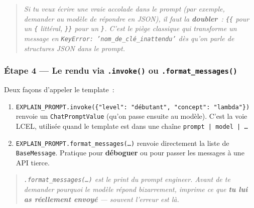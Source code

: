 \documentclass[11pt,a4paper]{article}
\begin{document}
\begin{quote}\itshape
Si tu veux écrire une \emph{vraie} accolade dans le prompt (par exemple,
demander au modèle de répondre en JSON), il faut la \textbf{doubler}~:
\texttt{\{\{} pour un \texttt{\{} littéral, \texttt{\}\}} pour un \texttt{\}}.
C'est le piège classique qui transforme un message en
\texttt{KeyError: 'nom\_de\_clé\_inattendu'} dès qu'on parle de structures
JSON dans le prompt.
\end{quote}

\subsubsection*{Étape 4 — Le rendu via \texttt{.invoke()} ou \texttt{.format\_messages()}}

\begin{center}
\end{center}

Deux façons d'appeler le template~:

\begin{enumerate}[leftmargin=*]
  \item \texttt{EXPLAIN\_PROMPT.invoke(\{"level": "débutant", "concept": "lambda"\})}
        renvoie un \texttt{ChatPromptValue} (qu'on passe ensuite au modèle).
        C'est la voie LCEL, utilisée quand le template est dans une chaîne
        \texttt{prompt | model | \dots}
  \item \texttt{EXPLAIN\_PROMPT.format\_messages(\dots)} renvoie directement
        la liste de \texttt{BaseMessage}. Pratique pour \textbf{déboguer} ou
        pour passer les messages à une API tierce.
\end{enumerate}

\begin{quote}\itshape
\texttt{.format\_messages(\dots)} est le \emph{print} du prompt engineer.
Avant de te demander pourquoi le modèle répond bizarrement, imprime ce que
\textbf{tu lui as réellement envoyé} — souvent l'erreur est là.
\end{quote}
\end{document}

